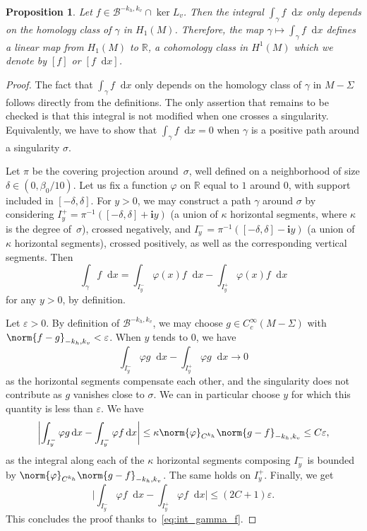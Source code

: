 \documentclass[10pt]{amsart}
\newcommand{\boB}{\mathcal{B}}
\newcommand{\R}{\mathbb{R}}
\newcommand{\dd}{\mathop{}\!\mathrm{d}}
\newcommand{\ic}{\mathbf{i}}
\newcommand{\absgg}[1]{\biggl \lvert#1\biggr\rvert}
\let\epsilon\varepsilon
\let\phi\varphi
\newtheorem{prop}[thm]{Proposition}
\theoremstyle{definition}
\numberwithin{equation}{section}
\begin{document}
\begin{prop}
\label{prop:define_H1} Let $f \in \boB^{-k_h, k_v} \cap \ker L_v$. Then the
integral $\int_\gamma f \dd x$ only depends on the homology class of $\gamma$
in $H_1(M)$. Therefore, the map $\gamma \mapsto \int_\gamma f\dd x$ defines a
linear map from $H_1(M)$ to $\R$, \ie a cohomology class in $H^1(M)$ which
we denote by $[f]$ or $[f\dd x]$.
\end{prop}
\begin{proof}
The fact that $\int_\gamma f \dd x$ only depends on the homology class of
$\gamma$ in $M-\Sigma$ follows directly from the definitions. The only
assertion that remains to be checked is that this integral is not modified
when one crosses a singularity. Equivalently, we have to show that
$\int_\gamma f \dd x = 0$ when $\gamma$ is a positive path around a
singularity $\sigma$.

Let $\pi$ be the covering projection around~$\sigma$, well defined on a
neighborhood of size $\delta \in (0, \beta_0/10)$. Let us fix a function
$\phi$ on $\R$ equal to $1$ around $0$, with support included in
$[-\delta,\delta]$. For $y>0$, we may construct a path $\gamma$ around
$\sigma$ by considering $I_y^+ = \pi^{-1}([-\delta, \delta] + \ic y)$ (a
union of $\kappa$ horizontal segments, where $\kappa$ is the degree of~$\sigma$), crossed negatively, and $I_y^- = \pi^{-1}([-\delta, \delta] - \ic
y)$ (a union of $\kappa$ horizontal segments), crossed positively, as well as
the corresponding vertical segments. Then
\begin{equation}
\label{eq:int_gamma_f}
\int_\gamma f \dd x
= \int_{I_y^-} \phi(x) f \dd x - \int_{I_y^+} \phi(x) f \dd x
\end{equation}
for any $y>0$, by definition.

Let $\epsilon>0$. By definition of $\boB^{-k_h, k_v}$, we may choose $g \in
C_c^\infty(M-\Sigma)$ with \hbox{$\norm{f-g}_{-k_h, k_v} < \epsilon$}. When $y$
tends to $0$, we have
\[
\int_{I_y^-} \phi g \dd x - \int_{I_y^+} \phi g \dd x
\to 0
\]
as the horizontal segments compensate each other, and the singularity
does not contribute as $g$ vanishes close to $\sigma$. We can in particular
choose $y$ for which this quantity is less than $\epsilon$. We have
\begin{equation*}
\absgg{\int_{I_y^-} \phi g \dd x - \int_{I_y^-} \phi f \dd x} \leq \kappa \norm{\phi}_{C^{k_h}} \norm{g - f}_{-k_h, k_v}
\leq C \epsilon,
\end{equation*}
as the integral along each of the $\kappa$ horizontal segments composing
$I_y^-$ is bounded by $\norm{\phi}_{C^{k_h}} \norm{g - f}_{-k_h, k_v}$. The
same holds on $I_y^+$. Finally, we get
\[
\absgg{\int_{I_y^-} \phi f \dd x -
\int_{I_y^+} \phi f \dd x} \leq (2C+1)\epsilon.
\]
This concludes the proof
thanks to~\eqref{eq:int_gamma_f}.
\end{proof}
\end{document}
